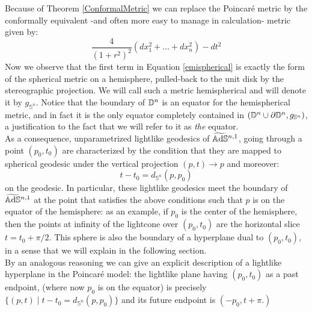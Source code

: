  Because of Theorem \ref{ConformalMetric} we can replace the Poincaré metric by the conformally equivalent -and often more easy to manage in calculation- metric given by:
 \begin{equation}\label{emispherical}
     \frac{4}{(1+r^2)^2}(dx_1^2+\dots+dx_n^2)-dt^2
 \end{equation} 
 Now we observe that the first term in Equation \ref{emispherical} is exactly the form of the spherical metric on a hemisphere, pulled-back to the unit disk by the stereographic projection. We will call such a metric hemispherical and will denote it by $g_{\mathbb{S}^n}$. Notice that the boundary of $\mathbb{D}^n$ is an equator for the hemispherical metric, and in fact it is the only equator completely contained in $(\mathbb{D}^n\cup\partial\mathbb{D}^n,g_{\mathbb{S}^n})$, a justification to the fact that we will refer to it as \textit{the} equator.\\
 As a consequence, unparametrized lightlike geodesics of $\widetilde{\mathbb{A}\mathrm{d}\mathbb{S}}{}^{n,1}$, going through a point $(p_0,t_0)$ are characterized by the condition that they are mapped to spherical geodesic under the vertical projection $(p,t)\to p$ and moreover: 
 \[
     t-t_0=d_{\mathbb{S}^n}(p,p_0)
 \] on the geodesic. In particular, these lightlike geodesics meet the boundary of $\widetilde{\mathbb{A}\mathrm{d}\mathbb{S}}{}^{n,1}$ at the point that satisfies the above conditions such that $p$ is on the equator of the hemisphere: as an example, if $p_0$ is the center of the hemisphere, then the points at infinity of the lightcone over $(p_0,t_0)$ are the horizontal slice $t=t_{0}+\pi/2.$ This sphere is also the boundary of a hyperplane dual to $(p_0,t_0)$, in a sense that we will explain in the following section. \\
 By an analogous reasoning we can give an explicit description of a lightlike hyperplane in the Poincaré model: the lightlike plane having $(p_0,t_0)$ as a past endpoint, (where now $p_0$ is on the equator) is precisely $\{(p,t)\;|\;t-t_0=d_{\mathbb{S}^n}(p,p_0)\}$ and its future endpoint is $(-p_0,t+\pi.)$ 


